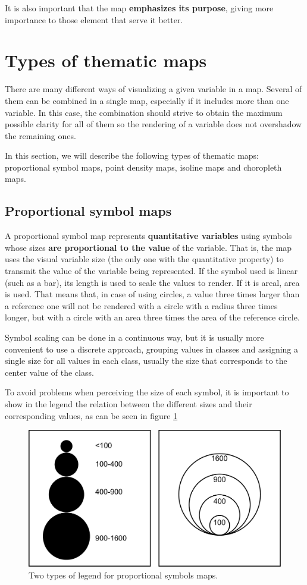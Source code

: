 It is also important that the map \textbf{emphasizes its purpose}, giving more importance to those element that serve it better.

\section{Types of thematic maps}

There are many different ways of visualizing a given variable in a map. Several of them can be combined in a single map, especially if it includes more than one variable. In this case, the combination should strive to obtain the maximum possible clarity for all of them so the rendering of a variable does not overshadow the remaining ones.

In this section, we will describe the following types of thematic maps: proportional symbol maps, point density maps, isoline maps and choropleth maps.


\subsection{Proportional symbol maps}

A proportional symbol map represents \textbf{quantitative variables} using symbols whose sizes \textbf{are proportional to the value} of the variable. That is, the map uses the visual variable size (the only one with the quantitative property) to transmit the value of the variable being represented. If the symbol used is linear (such as a bar), its length is used to scale the values to render. If it is areal, area is used. That means that, in case of using circles, a value three times larger than a reference one will not be rendered with a circle with a radius three times longer, but with a circle with an area three times the area of the reference circle.

Symbol scaling can be done in a continuous way, but it is usually more convenient to use a discrete approach, grouping values in classes and assigning a single size for all values in each class, usually the size that corresponds to the center value of the class. 

To avoid problems when perceiving the size of each symbol, it is important to show in the legend the relation between the different sizes and their corresponding values, as can be seen in figure \ref{Fig:LegendProportionalSymbols}

\begin{figure}[!hbt]
\centering
\includegraphics[width=.65\columnwidth]{Visualization/LegendProportionalSymbols.pdf}
\caption{\small Two types of legend for proportional symbols maps.}
\label{Fig:LegendProportionalSymbols} 
\end{figure}



